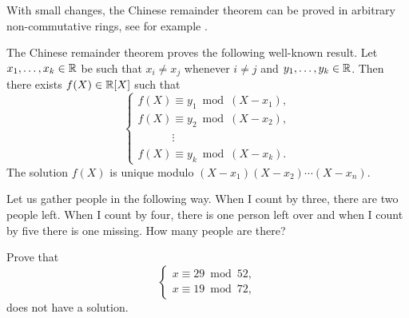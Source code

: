 With small changes, the Chinese remainder theorem can be proved 
in arbitrary non-commutative rings, see for example 
\cite[Chapter III, Theorem 2.25]{MR600654}. 

\begin{exercise}
	The Chinese remainder theorem proves the following well-known result. 
	Let $x_1,\dots,x_k\in\mathbb{R}$ be such that $x_i\ne x_j$ whenever $i\ne j$ 
	and $y_1,\dots,y_k\in\mathbb{R}$. Then there exists $f(X)\in\mathbb{R}[X]$ such that
	\[
	\begin{cases}
		f(X)\equiv y_1\bmod (X-x_1),\\
		f(X)\equiv y_2\bmod (X-x_2),\\
		\phantom{f(X)}\vdots\\
		f(X)\equiv y_k\bmod (X-x_k).  	
	\end{cases}
 	\]
 	The solution $f(X)$ is unique modulo $(X-x_1)(X-x_2)\cdots (X-x_n)$. 
\end{exercise}

%


\begin{exercise}
\label{xca:gather_people}
	Let us gather people in the following way. When I 
	count by three, there are two people left. 	When I count by four, 
	there is one person left over and when I count by five there is
	one missing. How many people are there?
\end{exercise}

\begin{exercise}
\label{xca:no_solution}
	Prove that 
	\[
	\begin{cases}
		x\equiv 29\bmod 52,\\
		x\equiv 19\bmod 72,
		\end{cases}
	\]
	does not have a solution.
\end{exercise}

